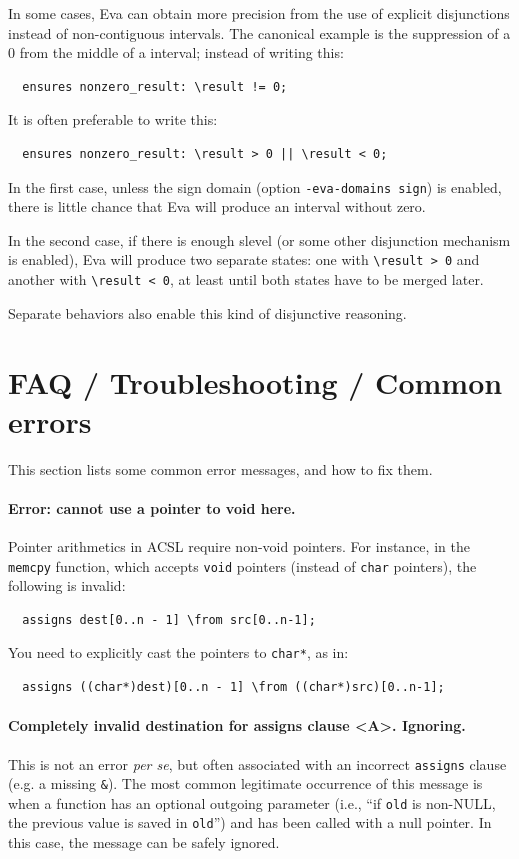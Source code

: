 \documentclass[web]{frama-c-book}
\newcommand{\Eva}{\textsf{Eva}}
\begin{document}
In some cases, \Eva{} can obtain more precision from the use of explicit
disjunctions instead of non-contiguous intervals. The canonical example
is the suppression of a 0 from the middle of a interval; instead of writing
this:

\begin{lstlisting}
  ensures nonzero_result: \result != 0;
\end{lstlisting}

It is often preferable to write this:

\begin{lstlisting}
  ensures nonzero_result: \result > 0 || \result < 0;
\end{lstlisting}

In the first case, unless the sign domain (option \texttt{-eva-domains sign})
is enabled, there is little chance that \Eva{} will produce an interval without
zero.

In the second case, if there is enough slevel (or some other disjunction
mechanism is enabled), \Eva{} will produce two separate states: one with
\verb+\result > 0+ and another with \verb+\result < 0+,
at least until both states have to be merged later.

Separate behaviors also enable this kind of disjunctive reasoning.

\section{FAQ / Troubleshooting / Common errors}
\label{sec:acsl-guide-faq}

This section lists some common error messages, and how to fix them.

\paragraph{Error: cannot use a pointer to void here.}
Pointer arithmetics in ACSL require non-void pointers. For instance,
in the \texttt{memcpy} function, which accepts \texttt{void} pointers
(instead of \texttt{char} pointers), the following is invalid:

\begin{lstlisting}
  assigns dest[0..n - 1] \from src[0..n-1];
\end{lstlisting}

You need to explicitly cast the pointers to \texttt{char*}, as in:

\begin{lstlisting}
  assigns ((char*)dest)[0..n - 1] \from ((char*)src)[0..n-1];
\end{lstlisting}

\paragraph{Completely invalid destination for assigns clause <A>. Ignoring.}
This is not an error {\em per se}, but often associated with an incorrect
\texttt{assigns} clause (e.g. a missing \texttt{\&}). The most common
legitimate occurrence of this message is when a function has an
optional outgoing parameter (i.e., ``if \texttt{old} is non-NULL, the previous
value is saved in \texttt{old}'') and has been called with a null pointer.
In this case, the message can be safely ignored.
\end{document}
